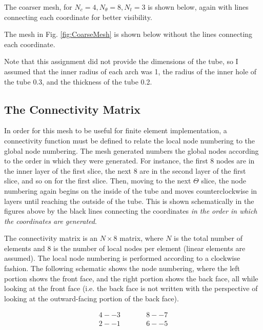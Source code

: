 \documentclass[10pt]{article}
\begin{document}
The coarser mesh, for \(N_c=4, N_\theta=8, N_t=3\) is shown below, again with lines connecting each coordinate for better visibility.



The mesh in Fig. \ref{fig:CoarseMesh} is shown below without the lines connecting each coordinate.



Note that this assignment did not provide the dimensions of the tube, so I assumed that the inner radius of each arch was 1, the radius of the inner hole of the tube 0.3, and the thickness of the tube 0.2.

\subsection{The Connectivity Matrix}

In order for this mesh to be useful for finite element implementation, a connectivity function must be defined to relate the local node numbering to the global node numbering. The mesh generated numbers the global nodes according to the order in which they were generated. For instance, the first 8 nodes are in the inner layer of the first slice, the next 8 are in the second layer of the first slice, and so on for the first slice. Then, moving to the next \(\Theta\) slice, the node numbering again begins on the inside of the tube and moves counterclockwise in layers until reaching the outside of the tube. This is shown schematically in the figures above by the black lines connecting the coordinates \textit{in the order in which the coordinates are generated}.

The connectivity matrix is an \(N\times8\) matrix, where \(N\) is the total number of elements and 8 is the number of local nodes per element (linear elements are assumed). The local node numbering is performed according to a clockwise fashion. The following schematic shows the node numbering, where the left portion shows the front face, and the right portion shows the back face, all while looking at the front face (i.e. the back face is not written with the perspective of looking at the outward-facing portion of the back face).

\begin{equation}
\begin{aligned}
4 -- 3 & \quad\quad & 8 -- 7\\
2 -- 1 & \quad\quad & 6 -- 5\\
\end{aligned}
\end{equation}
\end{document}
